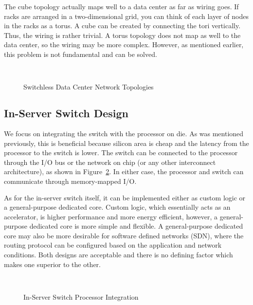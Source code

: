 The cube topology actually maps well to a data center as far as wiring goes.  If racks are arranged in a two-dimensional grid, you can think of each layer of nodes in the racks as a torus.  A cube can be created by connecting the tori vertically.  Thus, the wiring is rather trivial.  A torus topology does not map as well to the data center, so the wiring may be more complex.  However, as mentioned earlier, this problem is not fundamental and can be solved.

\begin{figure}
    \centering
    \\
    \vspace{-0.05in}
    \vspace{-0.07in}
    \caption{Switchless Data Center Network Topologies}
    \label{fig:switchless_topos}
\end{figure}

\subsection{In-Server Switch Design}

We focus on integrating the switch with the processor on die.  As was mentioned previously, this is beneficial because silicon area is cheap and the latency from the processor to the switch is lower.  The switch can be connected to the processor through the I/O bus or the network on chip (or any other interconnect architecture), as shown in Figure~\ref{fig:in_server_switch_design}.  In either case, the processor and switch can communicate through memory-mapped I/O.  

As for the in-server switch itself, it can be implemented either as custom logic or a general-purpose dedicated core.  Custom logic, which essentially acts as an accelerator, is higher performance and more energy efficient, however, a general-purpose dedicated core is more simple and flexible.  A general-purpose dedicated core may also be more desirable for software defined networks (SDN), where the routing protocol can be configured based on the application and network conditions.  Both designs are acceptable and there is no defining factor which makes one superior to the other.

\begin{figure}
    \centering
    ~
    \vspace{-0.07in}
    \caption{In-Server Switch Processor Integration}
    \label{fig:in_server_switch_design}
\end{figure}

